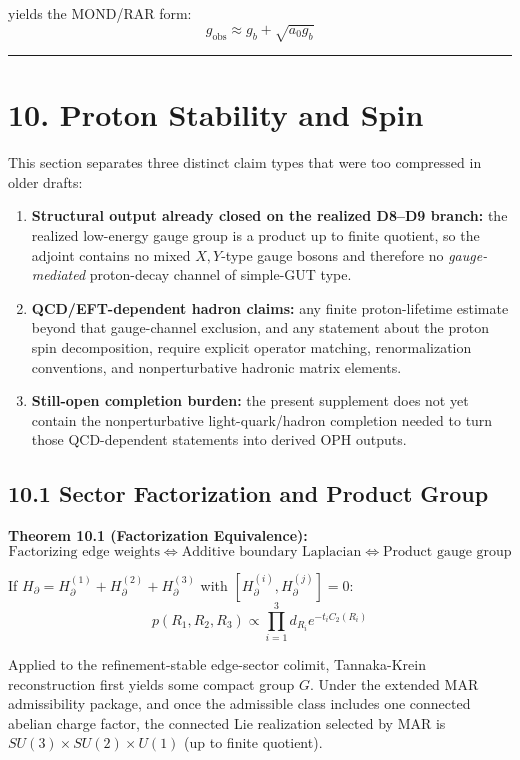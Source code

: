yields the MOND/RAR form: \[g_{\text{obs}} \approx g_b + \sqrt{a_0 g_b}\]

\begin{center}\rule{0.5\linewidth}{0.5pt}\end{center}

\section{10. Proton Stability and Spin}\label{10-proton-stability-and-spin}

This section separates three distinct claim types that were too compressed in older drafts:
\begin{enumerate}
\item \textbf{Structural output already closed on the realized D8--D9 branch:} the realized low-energy gauge group is a product up to finite quotient, so the adjoint contains no mixed \(X,Y\)-type gauge bosons and therefore no \emph{gauge-mediated} proton-decay channel of simple-GUT type.
\item \textbf{QCD/EFT-dependent hadron claims:} any finite proton-lifetime estimate beyond that gauge-channel exclusion, and any statement about the proton spin decomposition, require explicit operator matching, renormalization conventions, and nonperturbative hadronic matrix elements.
\item \textbf{Still-open completion burden:} the present supplement does not yet contain the nonperturbative light-quark/hadron completion needed to turn those QCD-dependent statements into derived OPH outputs.
\end{enumerate}

\subsection{10.1 Sector Factorization and Product Group}\label{101-sector-factorization-and-product-group}

\textbf{Theorem 10.1 (Factorization Equivalence):} \[\text{Factorizing edge weights} \Leftrightarrow \text{Additive boundary Laplacian} \Leftrightarrow \text{Product gauge group}\]

If \(H_\partial = H_\partial^{(1)} + H_\partial^{(2)} + H_\partial^{(3)}\) with \([H_\partial^{(i)}, H_\partial^{(j)}] = 0\): \[p(R_1, R_2, R_3) \propto \prod_{i=1}^3 d_{R_i} e^{-t_i C_2(R_i)}\]

Applied to the refinement-stable edge-sector colimit, Tannaka-Krein reconstruction first yields some compact group \(G\). Under the extended MAR admissibility package, and once the admissible class includes one connected abelian charge factor, the connected Lie realization selected by MAR is \(SU(3) \times SU(2) \times U(1)\) (up to finite quotient).

